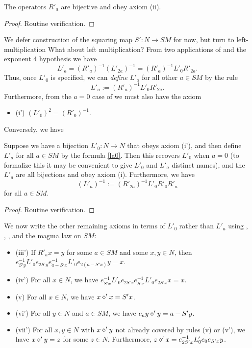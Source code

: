 \begin{lemma}\label{ra-prop}  The operators $R'_a$ are bijective and obey axiom (ii).
\end{lemma}

\begin{proof} Routine verification.
\end{proof}

We defer construction of the squaring map $S': N \to SM$ for now, but turn to left-multiplication
What about left multiplication?  From two applications of  and the exponent 4 hypothesis we have
$$ L'_a = (R'_a)^{-1} (L'_{2a})^{-1} = (R'_a)^{-1} L'_0 R'_{2a}.$$
Thus, once $L'_0$ is specified, we can \emph{define} $L'_a$ for all other $a \in SM$ by the rule
\begin{equation}\label{la0}
  L'_a := (R'_a)^{-1} L'_0 R'_{2a}.
\end{equation}
Furthermore, from the $a=0$ case of  we must also have the axiom
\begin{itemize}
  \item (i') $(L'_0)^2 = (R'_0)^{-1}$.
\end{itemize}

Conversely, we have

\begin{lemma}\label{l0-la}  Suppose we have a bijection $L'_0: N \to N$ that obeys axiom (i'), and then define $L'_a$ for all $a \in SM$ by the formula \eqref{la0}.  Then this recovers $L'_0$ when $a=0$ (to formalize this it may be convenient to give $L'_0$ and $L'_a$ distinct names), and the $L'_a$ are all bijections and obey axiom (i).  Furthermore, we have
\begin{equation}\label{la1}
  (L'_a)^{-1} := (R'_{2a})^{-1} L'_0 R'_0 R'_{a}
\end{equation}
for all $a \in SM$.
\end{lemma}

\begin{proof} Routine verification.
\end{proof}

We now write the other remaining axioms in terms of $L'_0$ rather than $L'_a$ using , , , and the magma law on $SM$:
\begin{itemize}
\item (iii')  If $R'_a x = y$ for some $a \in SM$ and some $x,y \in N$, then $e_{S'y}^{-1} L'_0 e_{2S'y} e_{a - S'x}^{-1} L'_0 e_{2(a - S'x)} y = x$.
\item (iv')  For all $x \in N$, we have $e_{S'x}^{-1} L'_0 e_{2S'x} e_{S'x}^{-1} L'_0 e_{2S'x} x = x$.
\item (v)  For all $x \in N$, we have $x \diamond' x = S'x$.
\item (vi')  For all $y \in N$ and $a \in SM$, we have $e_a y \diamond' y = a - S'y$.
\item (vii')  For all $x,y \in N$ with $x \diamond' y$ not already covered by rules (v) or (v'), we have $x \diamond' y = z$ for some $z \in N$.  Furthermore, $z \diamond' x = e_{2S'x}^{-1} L'_0 e_0 e_{S'x} y$.
\end{itemize}

